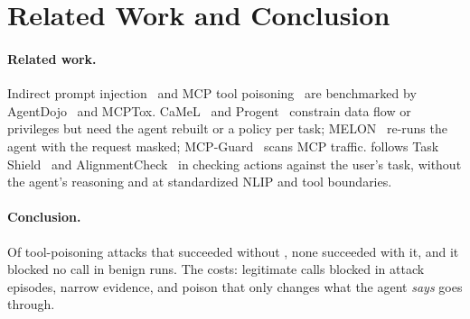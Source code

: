 \section{Related Work and Conclusion}\label{sec:related}

\paragraph{Related work.} Indirect prompt injection~\cite{greshake2023,liu2024formalizing}
and MCP tool poisoning~\cite{invariant2025,mcptox} are benchmarked by AgentDojo~\cite{agentdojo}
and MCPTox. CaMeL~\cite{camel} and Progent~\cite{progent} constrain data flow or privileges but
need the agent rebuilt or a policy per task; MELON~\cite{melon} re-runs the agent with the
request masked; MCP-Guard~\cite{mcpguard} scans MCP traffic. \sys follows Task
Shield~\cite{taskshield} and AlignmentCheck~\cite{llamafirewall} in checking actions against the
user's task, without the agent's reasoning and at standardized NLIP and tool boundaries.

\paragraph{Conclusion.} Of \PairedTotal{} tool-poisoning attacks that succeeded without
\sys, none succeeded with it, and it blocked no call in benign runs. The costs: legitimate calls blocked in \WrongBlockAttackEps{} attack episodes,
narrow evidence, and poison that only changes what the agent \emph{says} goes through.

